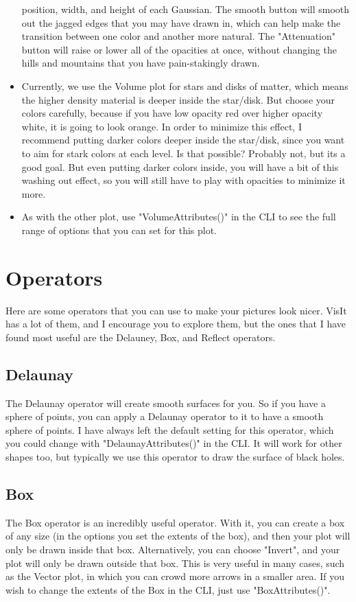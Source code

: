 \documentclass[english]{article}
\begin{document}
\begin{itemize}
              position, width, and height of each Gaussian. The smooth button will smooth out the jagged edges that you may
              have drawn in, which can help make the transition between one color and another more natural. The "Attenuation"
              button will raise or lower all of the opacities at once, without changing the hills and mountains that you
              have pain-stakingly drawn.
        \item Currently, we use the Volume plot for stars and disks of matter, which means the higher density material is 
              deeper inside the star/disk. But choose your colors carefully, because if you have low opacity red over higher 
              opacity white, it is going to look orange. In order to minimize this effect, I recommend putting darker colors 
              deeper inside the star/disk, since you want to aim for stark colors at each level. Is that possible? Probably 
              not, but its a good goal. But even putting darker colors inside, you will have a bit of this washing out effect, 
              so you will still have to play with opacities to minimize it more.
        \item As with the other plot, use "VolumeAttributes()" in the CLI to see the full range of options that you can set 
              for this plot. 
    \end{itemize}


\section{Operators}

Here are some operators that you can use to make your pictures look nicer. VisIt has a lot of them, and I
encourage you to explore them, but the ones that I have found most useful are the Delauney, Box, and Reflect
operators.


    \subsection{Delaunay}
    The Delaunay operator will create smooth surfaces for you. So if you have a sphere of points, you can apply a Delaunay
    operator to it to have a smooth sphere of points. I have always left the default setting for this operator, which you 
    could change with "DelaunayAttributes()" in the CLI. It will work for other shapes too, but typically we use this 
    operator to draw the surface of black holes. 
    
    \subsection{Box}
    The Box operator is an incredibly useful operator. With it, you can create a box of any size (in the options you set the
    extents of the box), and then your plot will only be drawn inside that box. Alternatively, you can choose "Invert", and
    your plot will only be drawn outside that box. This is very useful in many cases, such as the Vector plot, in which you 
    can crowd more arrows in a smaller area. If you wish to change the extents of the Box in the CLI, just use 
    "BoxAttributes()".
    
\end{document}
